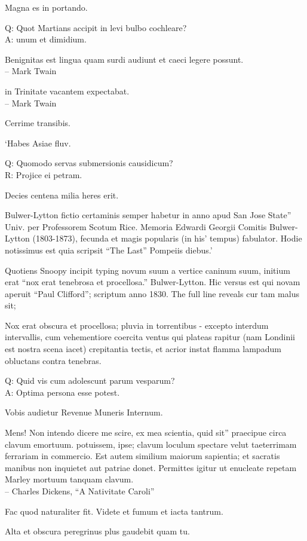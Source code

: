 \documentclass[titlepage,12pt]{memoir}
\begin{document}
Magna es in portando.

Q: Quot Martians accipit in levi bulbo cochleare?\\
A: unum et dimidium.

 Benignitas est lingua quam surdi audiunt et caeci legere possunt.
\\-- Mark Twain

in Trinitate vacantem expectabat.
\\-- Mark Twain

Cerrime transibis.

‘Habes Asiae fluv.

Q: Quomodo servas submersionis causidicum?\\
R: Projice ei petram.

Decies centena milia heres erit.

Bulwer-Lytton fictio certaminis semper habetur in anno apud San Jose State”
Univ. per Professorem Scotum Rice. Memoria Edwardi Georgii
Comitis Bulwer-Lytton (1803-1873), fecunda et magis popularis (in his’
tempus) fabulator. Hodie notissimus est quia scripsit “The Last”
Pompeiis diebus.’

Quotiens Snoopy incipit typing novum suum a vertice caninum suum,
initium erat “nox erat tenebrosa et procellosa.”
Bulwer-Lytton. Hic versus est qui novam aperuit “Paul Clifford”;
scriptum anno 1830. The full line reveals cur tam malus sit;

Nox erat obscura et procellosa; pluvia in torrentibus - excepto
interdum intervallis, cum vehementiore coercita
ventus qui plateas rapitur (nam Londinii est nostra scena
iacet) crepitantia tectis, et acrior instat
flamma lampadum obluctans contra tenebras.

Q: Quid vis cum adolescunt parum vesparum?\\
A: Optima persona esse potest.

Vobis audietur Revenue Muneris Internum.

Mens! Non intendo dicere me scire, ex mea scientia, quid sit”
praecipue circa clavum emortuum. potuissem, ipse;
clavum loculum spectare velut taeterrimam ferrariam in commercio.
Est autem similium maiorum sapientia; et sacratis manibus
non inquietet aut patriae donet. Permittes igitur
ut enucleate repetam Marley mortuum tanquam clavum.
\\-- Charles Dickens, “A Nativitate Caroli”

Fac quod naturaliter fit. Videte et fumum et iacta tantrum.

Alta et obscura peregrinus plus gaudebit quam tu.
\end{document}
